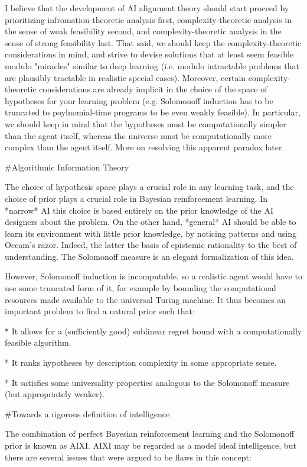 \documentclass[a4paper]{article}
\begin{document}
I believe that the development of AI alignment theory should start proceed by prioritizing infromation-theoretic analysis first, complexity-theoretic analysis in the sense of weak feasibility second, and complexity-theoretic analysis in the sense of strong feasibility last. That said, we should keep the complexity-theoretic considerations in mind, and strive to devise solutions that at least seem feasible modulo "miracles" similar to deep learning (i.e. modulo intractable problems that are plausibly tractable in realistic special cases). Moreover, certain complexity-theoretic considerations are already implicit in the choice of the space of hypotheses for your learning problem (e.g. Solomonoff induction has to be truncated to poylnomial-time programs to be even weakly feasible). In particular, we should keep in mind that the hypotheses must be computationally simpler than the agent itself, whereas the universe must be computationally more complex than the agent itself. More on resolving this apparent paradox later.

\#Algorithmic Information Theory

The choice of hypothesis space plays a crucial role in any learning task, and the choice of prior plays a crucial role in Bayesian reinforcement learning. In *narrow* AI this choice is based entirely on the prior knowledge of the AI designers about the problem. On the other hand, *general* AI should be able to learn its environment with little prior knowledge, by noticing patterns and using Occam's razor. Indeed, the latter the basis of epistemic rationality to the best of understanding. The Solomonoff measure is an elegant formalization of this idea.

However, Solomonoff induction is incomputable, so a realistic agent would have to use some truncated form of it, for example by bounding the computational resources made available to the universal Turing machine. It thus becomes an important problem to find a natural prior such that:

* It allows for a (sufficiently good) sublinear regret bound with a computationally feasible algorithm.

* It ranks hypotheses by description complexity in some appropriate sense.

* It satisfies some universality properties analogous to the Solomonoff measure (but appropriately weaker).

\#Towards a rigorous definition of intelligence

The combination of perfect Bayesian reinforcement learning and the Solomonoff prior is known as AIXI. AIXI may be regarded as a model ideal intelligence, but there are several issues that were argued to be flaws in this concept:
\end{document}
